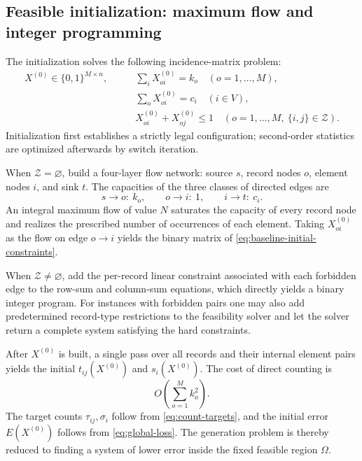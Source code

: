 \documentclass[11pt,a4paper]{article}
\numberwithin{equation}{section}
\theoremstyle{definition}
\numberwithin{algorithm}{section}
\begin{document}
\subsection{Feasible initialization: maximum flow and integer programming}\label{subsec:baseline-init}

The initialization solves the following incidence-matrix problem:
\begin{equation}
\begin{aligned}
X^{(0)}\in\{0,1\}^{M\times n},\qquad&
\sum_iX^{(0)}_{oi}=k_o\quad(o=1,\ldots,M),\\
&\sum_oX^{(0)}_{oi}=c_i\quad(i\in V),\\
&X^{(0)}_{oi}+X^{(0)}_{oj}\le1
\quad(o=1,\ldots,M,\ \{i,j\}\in\mathcal Z).
\end{aligned}
\label{eq:baseline-initial-constraints}
\end{equation}
Initialization first establishes a strictly legal configuration;
second-order statistics are optimized afterwards by switch iteration.

When $\mathcal Z=\varnothing$, build a four-layer flow network:
source $s$, record nodes $o$, element nodes $i$, and sink $t$.
The capacities of the three classes of directed edges are
\begin{equation}
s\to o:\ k_o,\qquad o\to i:\ 1,\qquad i\to t:\ c_i.
\label{eq:baseline-network}
\end{equation}
An integral maximum flow of value $N$ saturates the capacity of every record node and
realizes the prescribed number of occurrences of each element.
Taking $X^{(0)}_{oi}$ as the flow on edge $o\to i$ yields the binary matrix of
\eqref{eq:baseline-initial-constraints}.

When $\mathcal Z\ne\varnothing$, add the per-record linear constraint associated with each
forbidden edge to the row-sum and column-sum equations, which directly yields a binary
integer program.
For instances with forbidden pairs one may also add predetermined record-type restrictions
to the feasibility solver and let the solver return a complete system satisfying the hard
constraints.

After $X^{(0)}$ is built, a single pass over all records and their internal element pairs
yields the initial $t_{ij}(X^{(0)})$ and $s_i(X^{(0)})$.
The cost of direct counting is
\begin{equation}
O\!\left(\sum_{o=1}^M k_o^2\right).
\label{eq:baseline-count-cost}
\end{equation}
The target counts $\tau_{ij},\sigma_i$ follow from \eqref{eq:count-targets}, and the initial
error $E(X^{(0)})$ follows from \eqref{eq:global-loss}.
The generation problem is thereby reduced to finding a system of lower error inside the
fixed feasible region $\Omega$.
\end{document}
